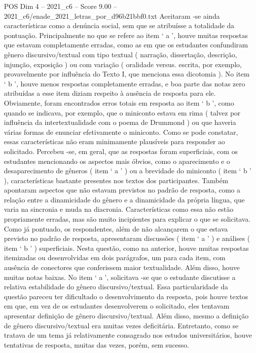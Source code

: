 \begin{textsample}{POS Dim 4 – 2021\_c6 – Score 9.00 – 2021\_c6/enade\_2021\_letras\_por\_d96b21bbf0.txt}
Aceitaram -se ainda características como a denúncia social, sem que se atribuísse a totalidade da pontuação.
Principalmente no que se refere ao item ‘ a ’, houve muitas respostas que estavam completamente erradas, como as em que os estudantes confundiram gênero discursivo/textual com tipo textual ( narração, dissertação, descrição, injunção, exposição ) ou com variação ( oralidade versus. escrita, por exemplo, provavelmente por influência do Texto I, que menciona essa dicotomia ).
No item ‘ b ’, houve menos respostas completamente erradas, e boa parte das notas zero atribuídas a esse item diziam respeito à ausência de resposta para ele.
Obviamente, foram encontrados erros totais em resposta ao item ‘ b ’, como quando se indicava, por exemplo, que o miniconto estava em rima ( talvez por influência da intertextualidade com o poema de Drummond ) ou que haveria várias formas de enunciar efetivamente o miniconto.
Como se pode constatar, essas características não eram minimamente plausíveis para responder ao solicitado.
Percebeu -se, em geral, que as respostas foram superficiais, com os estudantes mencionando os aspectos mais óbvios, como o aparecimento e o desaparecimento de gêneros ( item ‘ a ’ ) ou a brevidade do miniconto ( item ‘ b ’ ), características bastante presentes nos textos dos participantes.
Também apontaram aspectos que não estavam previstos no padrão de resposta, como a relação entre a dinamicidade do gênero e a dinamicidade da própria língua, que varia na sincronia e muda na diacronia.
Características como essa não estão propriamente erradas, mas são muito incipientes para explicar o que se solicitava.
Como já pontuado, os respondentes, além de não alcançarem o que estava previsto no padrão de resposta, apresentaram discussões ( item ‘ a ’ ) e análises ( item ‘ b ’ ) superficiais.
Nesta questão, como na anterior, houve muitas respostas itemizadas ou desenvolvidas em dois parágrafos, um para cada item, com ausência de conectores que conferissem maior textualidade.
Além disso, houve muitas notas baixas.
No item ‘ a ’, solicitava -se que o estudante discutisse a relativa estabilidade do gênero discursivo/textual.
Essa particularidade da questão pareceu ter dificultado o desenvolvimento da resposta, pois houve textos em que, em vez de os estudantes desenvolverem o solicitado, eles tentavam apresentar definição de gênero discursivo/textual.
Além disso, mesmo a definição de gênero discursivo/textual era muitas vezes deficitária.
Entretanto, como se tratava de um tema já relativamente consagrado nos estudos universitários, houve tentativas de resposta, muitas das vezes, porém, sem sucesso.

\end{textsample}
